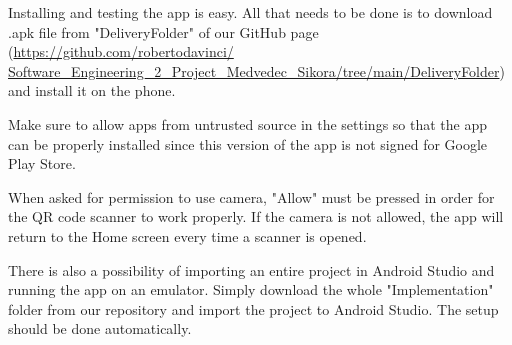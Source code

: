 \hspace{\parindent} Installing and testing the app is easy.
All that needs to be done is to download .apk file from "DeliveryFolder" of our GitHub page (\url{https://github.com/robertodavinci/ Software_Engineering_2_Project_Medvedec_Sikora/tree/main/DeliveryFolder}) and install it on the phone.\newline

Make sure to allow apps from untrusted source in the settings so that the app can be properly installed since this version of the app is not signed for Google Play Store. \newline

When asked for permission to use camera, "Allow" must be pressed in order for the QR code scanner to work properly. If the camera is not allowed, the app will return to the Home screen every time a scanner is opened.\newline

There is also a possibility of importing an entire project in Android Studio and running the app on an emulator.
Simply download the whole "Implementation" folder from our repository and import the project to Android Studio. The setup should be done automatically. 
